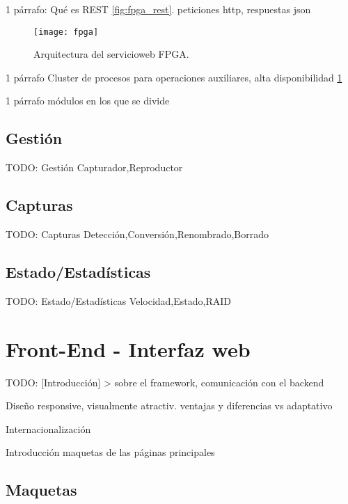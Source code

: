 1 párrafo: Qué es REST \ref{fig:fpga_rest}. peticiones http, respuestas json

\begin{figure}[!htp]
  \centering
  \texttt{[image: fpga]}
  \caption{Arquitectura del \gls{servicioweb} \gls{FPGA}.}
  \label{fig:arquitectura_servicio}
\end{figure}

1 párrafo Cluster de procesos para operaciones auxiliares, alta disponibilidad \ref{fig:arquitectura_servicio}

1 párrafo módulos en los que se divide


\subsection{Gestión\label{ssec:dis:gestion}}

TODO: Gestión
  {Capturador,Reproductor}


\subsection{Capturas\label{ssec:dis:capturas}}

TODO: Capturas
  {Detección,Conversión,Renombrado,Borrado}


\subsection{Estado/Estadísticas\label{ssec:dis:estado_estadisticas}}

TODO: Estado/Estadísticas
  {Velocidad,Estado,RAID}


\section{Front-End - Interfaz web\label{sec:dis:interfaz_web}}

TODO: [Introducción] > sobre el framework, comunicación con el backend

Diseño responsive, visualmente atractiv. ventajas y diferencias vs adaptativo

Internacionalización

Introducción maquetas de las páginas principales

\subsection{Maquetas\label{ssec:dis:maquetas}}

